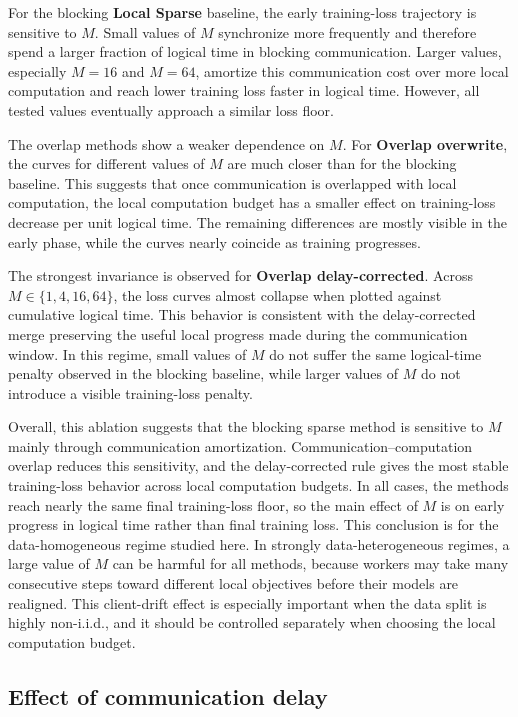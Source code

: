 \documentclass{article}
\theoremstyle{plain}
\theoremstyle{definition}
\begin{document}
For the blocking \textbf{Local Sparse} baseline, the early training-loss
trajectory is sensitive to $M$.
Small values of $M$ synchronize more frequently and therefore spend a larger
fraction of logical time in blocking communication.
Larger values, especially $M=16$ and $M=64$, amortize this communication cost
over more local computation and reach lower training loss faster in logical
time.
However, all tested values eventually approach a similar loss floor.

The overlap methods show a weaker dependence on $M$.
For \textbf{Overlap overwrite}, the curves for different values of $M$ are much
closer than for the blocking baseline.
This suggests that once communication is overlapped with local computation, the
local computation budget has a smaller effect on training-loss decrease per
unit logical time.
The remaining differences are mostly visible in the early phase, while the
curves nearly coincide as training progresses.

The strongest invariance is observed for \textbf{Overlap delay-corrected}.
Across $M \in \{1,4,16,64\}$, the loss curves almost collapse when plotted
against cumulative logical time.
This behavior is consistent with the delay-corrected merge preserving the
useful local progress made during the communication window.
In this regime, small values of $M$ do not suffer the same logical-time penalty
observed in the blocking baseline, while larger values of $M$ do not introduce
a visible training-loss penalty.

Overall, this ablation suggests that the blocking sparse method is sensitive to
$M$ mainly through communication amortization.
Communication--computation overlap reduces this sensitivity, and the
delay-corrected rule gives the most stable training-loss behavior across local
computation budgets.
In all cases, the methods reach nearly the same final training-loss floor, so
the main effect of $M$ is on early progress in logical time rather than final
training loss.
This conclusion is for the data-homogeneous regime studied here.
In strongly data-heterogeneous regimes, a large value of $M$ can be harmful for
all methods, because workers may take many consecutive steps toward different
local objectives before their models are realigned.
This client-drift effect is especially important when the data split is highly
non-i.i.d., and it should be controlled separately when choosing the local
computation budget.


\subsection{Effect of communication delay}
\label{subsec:communication-delay-ablation}
\end{document}
